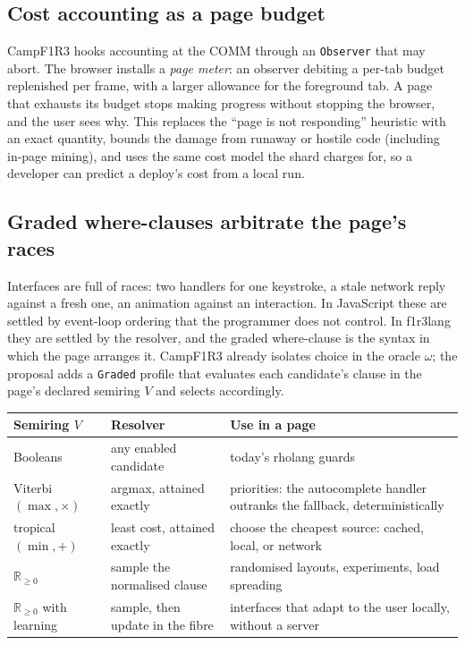 \documentclass[11pt]{article}
\theoremstyle{definition}
\theoremstyle{remark}
\newcommand{\fl}{f1r3lang}
\newcommand{\Camp}{CampF1R3}
\newcommand{\code}[1]{\texttt{#1}}
\begin{document}
\subsection{Cost accounting as a page budget}\label{sec:cost}

\Camp{} hooks accounting at the COMM through an \code{Observer} that may abort. The
browser installs a \emph{page meter}: an observer debiting a per-tab budget replenished
per frame, with a larger allowance for the foreground tab. A page that exhausts its
budget stops making progress without stopping the browser, and the user sees why.
This replaces the ``page is not responding'' heuristic with an exact quantity, bounds
the damage from runaway or hostile code (including in-page mining), and uses the same
cost model the shard charges for, so a developer can predict a deploy's cost from a
local run.

\subsection{Graded where-clauses arbitrate the page's races}\label{sec:graded}

Interfaces are full of races: two handlers for one keystroke, a stale network reply
against a fresh one, an animation against an interaction. In JavaScript these are
settled by event-loop ordering that the programmer does not control. In \fl{} they
are settled by the resolver, and the graded where-clause is the syntax in which the
page arranges it. \Camp{} already isolates choice in the oracle $\omega$; the proposal
adds a \code{Graded} profile that evaluates each candidate's clause in the page's
declared semiring $V$ and selects accordingly.

\begin{center}
\begin{tabularx}{\linewidth}{@{}p{3.1cm}p{3.6cm}X@{}}
\toprule
Semiring $V$ & Resolver & Use in a page\\
\midrule
Booleans & any enabled candidate & today's rholang guards\\
Viterbi $(\max,\times)$ & argmax, attained exactly & priorities: the autocomplete handler outranks the fallback, deterministically\\
tropical $(\min,+)$ & least cost, attained exactly & choose the cheapest source: cached, local, or network\\
$\mathbb{R}_{\geq 0}$ & sample the normalised clause & randomised layouts, experiments, load spreading\\
$\mathbb{R}_{\geq 0}$ with learning & sample, then update in the fibre & interfaces that adapt to the user locally, without a server\\
\bottomrule
\end{tabularx}
\end{center}
\end{document}
